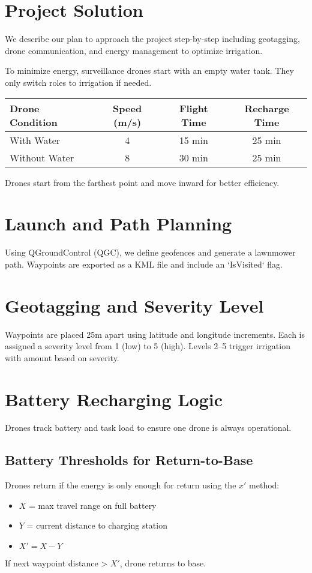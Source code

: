 \documentclass[12pt]{article}
\begin{document}
\section*{Project Solution}
We describe our plan to approach the project step-by-step including geotagging, drone communication, and energy management to optimize irrigation.

To minimize energy, surveillance drones start with an empty water tank. They only switch roles to irrigation if needed.

\begin{center}
\begin{tabular}{|l|c|c|c|}
\hline
\textbf{Drone Condition} & \textbf{Speed (m/s)} & \textbf{Flight Time} & \textbf{Recharge Time} \\
\hline
With Water & 4 & 15 min & 25 min \\
Without Water & 8 & 30 min & 25 min \\
\hline
\end{tabular}
\end{center}

Drones start from the farthest point and move inward for better efficiency.

\section*{Launch and Path Planning}
Using QGroundControl (QGC), we define geofences and generate a lawnmower path. Waypoints are exported as a KML file and include an `IsVisited` flag.

\section*{Geotagging and Severity Level}
Waypoints are placed 25m apart using latitude and longitude increments. Each is assigned a severity level from 1 (low) to 5 (high). Levels 2–5 trigger irrigation with amount based on severity.

\section*{Battery Recharging Logic}
Drones track battery and task load to ensure one drone is always operational.

\subsection*{Battery Thresholds for Return-to-Base}
Drones return if the energy is only enough for return using the $x'$ method:
\begin{itemize}
  \item $X$ = max travel range on full battery
  \item $Y$ = current distance to charging station
  \item $X' = X - Y$
\end{itemize}
If next waypoint distance > $X'$, drone returns to base.
\end{document}
